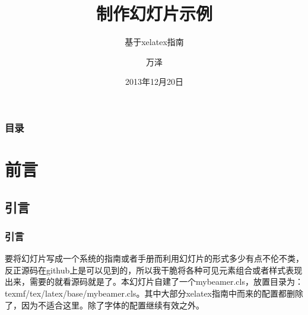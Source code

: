 \documentclass[xetex,compress]{mybeamer}
\title{制作幻灯片示例}
\subtitle{基于xelatex指南}
\author{万泽}
\date{2013年12月20日}
\begin{document}
\begin{frame}
\titlepage
\end{frame}


\begin{frame}
\frametitle{目录}
\setcounter{tocdepth}{1}
\tableofcontents[pausesections]%
\end{frame}



\section{前言}%
\subsection{引言}
\begin{frame}
\frametitle{引言}
\begin{block}{}
要将幻灯片写成一个系统的指南或者手册而利用幻灯片的形式多少有点不伦不类，反正源码在github上是可以见到的，所以我干脆将各种可见元素组合或者样式表现出来，需要的就看源码就是了。本幻灯片自建了一个mybeamer.cls，放置目录为：texmf/tex/latex/base/mybeamer.cls。其中大部分xelatex指南中而来的配置都删除了，因为不适合这里。除了字体的配置继续有效之外。
\end{block}
\end{frame}
\end{document}
